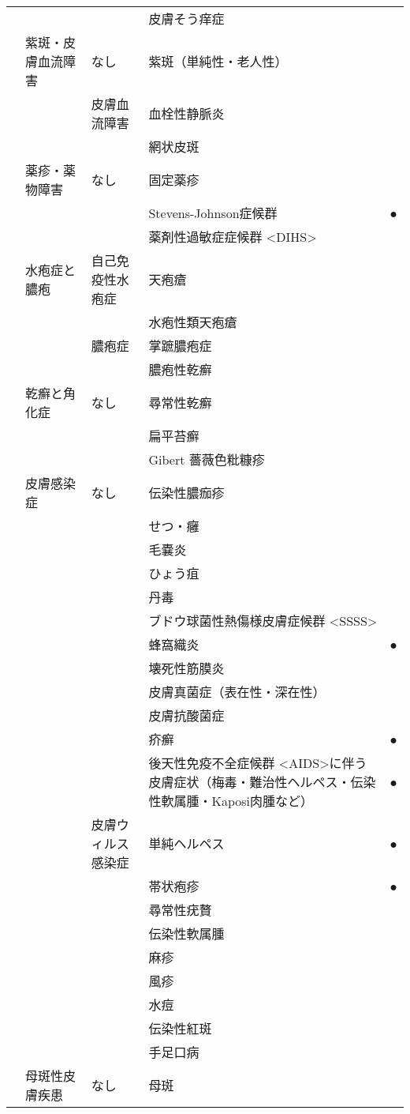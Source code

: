 \begin{xltabular}{\linewidth}{XXXXX}
 &  &  & 皮膚そう痒症 &  \\
 & 紫斑・皮膚血流障害 & なし & 紫斑（単純性・老人性） &  \\
 &  & 皮膚血流障害 & 血栓性静脈炎 &  \\
 &  &  & 網状皮斑 &  \\
 & 薬疹・薬物障害 & なし & 固定薬疹 &  \\
 &  &  & Stevens-Johnson症候群 & ● \\
 &  &  & 薬剤性過敏症症候群 <DIHS> &  \\
 & 水疱症と膿疱 & 自己免疫性水疱症 & 天疱瘡 &  \\
 &  &  & 水疱性類天疱瘡 &  \\
 &  & 膿疱症 & 掌蹠膿疱症 &  \\
 &  &  & 膿疱性乾癬 &  \\
 & 乾癬と角化症 & なし & 尋常性乾癬 &  \\
 &  &  & 扁平苔癬 &  \\
 &  &  & Gibert 薔薇色粃糠疹 &  \\
 & 皮膚感染症 & なし & 伝染性膿痂疹 &  \\
 &  &  & せつ・癰 &  \\
 &  &  & 毛嚢炎 &  \\
 &  &  & ひょう疽 &  \\
 &  &  & 丹毒 &  \\
 &  &  & ブドウ球菌性熱傷様皮膚症候群 <SSSS> &  \\
 &  &  & 蜂窩織炎 & ● \\
 &  &  & 壊死性筋膜炎 &  \\
 &  &  & 皮膚真菌症（表在性・深在性） &  \\
 &  &  & 皮膚抗酸菌症 &  \\
 &  &  & 疥癬 & ● \\
 &  &  & 後天性免疫不全症候群 <AIDS>に伴う皮膚症状（梅毒・難治性ヘルペス・伝染性軟属腫・Kaposi肉腫など） & ● \\
 &  & 皮膚ウィルス感染症 & 単純ヘルペス & ● \\
 &  &  & 帯状疱疹 & ● \\
 &  &  & 尋常性疣贅 &  \\
 &  &  & 伝染性軟属腫 &  \\
 &  &  & 麻疹 &  \\
 &  &  & 風疹 &  \\
 &  &  & 水痘 &  \\
 &  &  & 伝染性紅斑 &  \\
 &  &  & 手足口病 &  \\
 & 母斑性皮膚疾患 & なし & 母斑 &  \\

\end{xltabular}
